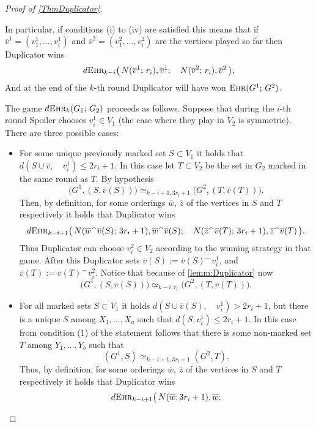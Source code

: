 \documentclass[12pt,notitlepage,a4paper]{article}
\theoremstyle{definition}
\newcommand{\ehr}{\textsc{Ehr}}
\begin{document}
\begin{proof}[Proof of \cref{ThmDuplicator}]
\begin{itemize}
		
	\end{itemize}
	In particular, if conditions (i) to (iv) are satisfied this means
	that if $\overline{v}^1=(v^1_1,\dots,v^1_i)$ and
	$\overline{v}^2=(v^2_1,\dots, v^2_i)$ are the vertices played so far
	then Duplicator wins
	\[
	d\ehr_{k-i}\big(\,
	N(\overline{v}^1;\, r_i), \overline{v}^1; \quad
	N(\overline{v}^2;\, r_i),\overline{v}^2 \,
	\big),	
	\]
	And at the end of the $k$-th round Duplicator will have won
	$\ehr(G^1;\, G^2)$. \par
	The game $d\ehr_k(G_1; \, G_2)$ proceeds as follows. Suppose 
	that during the $i$-th round Spoiler chooses $v^1_i\in V_1$ 
	(the case where they play in $V_2$ is symmetric). There are 
	three possible cases:
	\begin{itemize}
		\item For some unique previously marked set $S\subset V_1$ 
		it holds that $d(S\cup \overline{v},\quad v^1_i)\leq 2r_i +1$. 
		In this case let $T\subset V_2$ be the set in $G_2$ marked in the 
		same round as $T$. By hypothesis 
		\[ \big(G^1,(S,\overline{v}(S))\big)
		\simeq_{k-i+1,3r_i+1}
		\big(G^2,(T,\overline{v}(T))\big). 		
		\]
		Then, by definition,
		for some orderings $\overline{w}$, $\overline{z}$
		of the vertices in $S$ and $T$ respectively it holds that
		Duplicator wins
		\[
		d\ehr_{k-i+1}\big(\,
		N(\overline{w}^\smallfrown \overline{v}(S); \, 3r_i	+ 1)
		, \overline{w}^\smallfrown \overline{v}(S); \quad
		N(\overline{z}^\smallfrown \overline{v}(T); \, 3r_i	+ 1)
		, \overline{z}^\smallfrown \overline{v}(T)\,	
		\big).		
		\]
		Thus Duplicator can choose $v^2_i\in V_2$ according to the 
		winning strategy in that game. After this Duplicator sets 
		$\overline{v}(S):= \overline{v}(S)^\smallfrown v^1_i$, and
		$\overline{v}(T):= \overline{v}(T)^\smallfrown v^2_i$. Notice
		that because of \cref{lemm:Duplicator} now
		\[
		\big(G^1, (S,\overline{v}(S))\big)\simeq_{k-i,r_i}
		\big(G^2, (T,\overline{v}(T))\big).
		\]
		\item For all marked sets $S\subset V_1$ it holds
		$d(S\cup \overline{v}(S), \quad v^1_i)>2r_i +1$, but there is
		a unique $S$ among $X_1,\dots, X_a$ such that
		$d(S,v^1_i)\leq 2r_i+1$. In this case from condition (1)
		of the statement follows that there is some non-marked
		set $T$ among $Y_1,\dots, Y_b$ such that
		\[
		(G^1,S)\simeq_{k-i+1,3r_i+1} (G^2,T).\] 
		Thus, by definition, for some orderings $\overline{w}$, 
		$\overline{z}$ of the vertices in $S$ and $T$ respectively
		it holds that Duplicator wins
		\[
		d\ehr_{k-i+1}\big( \,
		N(\overline{w};3r_i+1), \overline{w};
\]
\end{itemize}
\end{proof}
\end{document}
